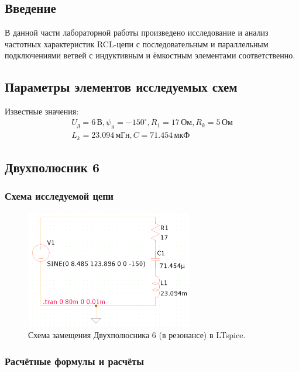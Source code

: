 \subsection{Введение}
В данной части лабораторной работы произведено исследование и анализ частотных характеристик RCL-цепи с последовательным и параллельным подключениями ветвей с индуктивным и ёмкостным элементами соответственно.

\subsection{Параметры элементов исследуемых схем}
\begin{center}
	Известные значения:
	\[
		\begin{gathered}
			U_{\text{д}} = 6 \, \text{В}, \psi_{\text{н}} = -150^{\circ}, R_1 = 17 \, \text{Ом}, R_k = 5 \, \text{Ом} \\
			L_k = 23.094 \, \text{мГн}, C = 71.454 \, \text{мкФ}
		\end{gathered}
	\]
\end{center}


\subsection{Двухполюсник 6}

\subsubsection{Схема исследуемой цепи}
\begin{figure}[H]
	\centering
	\includegraphics[width=0.65\textwidth]{./data/schema1_p2}
	\caption{Схема замещения Двухполюсника 6 (в резонансе) в LTspice.}
\end{figure}

\subsubsection{Расчётные формулы и расчёты}


